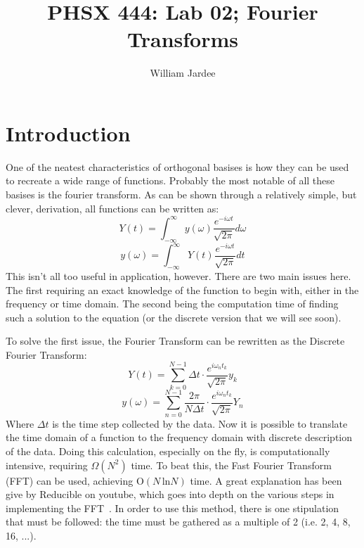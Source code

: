 \documentclass[12pt]{article}
\begin{document}
    
\title{PHSX 444: Lab 02; Fourier Transforms}
\author{William Jardee}
\maketitle
    
\section{Introduction}

    
One of the neatest characteristics of orthogonal basises is how they can be used to recreate a wide range of functions. Probably the most notable of all these basises is the fourier transform. As can be shown through a relatively simple, but clever, derivation, all functions can be written as:
\begin{equation*}
    Y(t) = \int^\infty_{-\infty} y(\omega) \frac{e^{-i\omega t}}{\sqrt{2\pi}} d\omega
    \label{eq:fourier_time}
\end{equation*}
\begin{equation*}
    y(\omega) = \int^\infty_{-\infty} Y(t) \frac{e^{-i\omega t}}{\sqrt{2\pi}} dt
    \label{eq:fourier_freq}
\end{equation*}
This isn't all too useful in application, however. There are two main issues here. The first requiring an exact knowledge of the function to begin with, either in the frequency or time domain. The second being the computation time of finding such a solution to the equation (or the discrete version that we will see soon).
    
To solve the first issue, the Fourier Transform can be rewritten as the Discrete Fourier Transform:
\begin{equation*}
    Y(t) = \sum^{N-1}_{k=0} \Delta t \cdot \frac{e^{i \omega_n t_k}}{\sqrt{2\pi}} y_k 
\end{equation*}
\begin{equation*}
    y(\omega) = \sum^{N-1}_{n=0} \frac{2 \pi}{N \Delta t} \cdot \frac{e^{i \omega_n t_k}}{\sqrt{2\pi}} Y_n
\end{equation*}
Where $\Delta t$ is the time step collected by the data. Now it is possible to translate the time domain of a function to the frequency domain with discrete description of the data. Doing this calculation, especially on the fly, is computationally intensive, requiring $\Omega(N^2)$ time. To beat this, the Fast Fourier Transform (FFT) can be used, achieving O$(N \, \text{ln}N)$ time. A great explanation has been give by Reducible on youtube, which goes into depth on the various steps in implementing the FFT~\cite{youtube}. In order to use this method, there is one stipulation that must be followed: the time must be gathered as a multiple of 2 (i.e. 2, 4, 8, 16, ...). 
    
\end{document}
